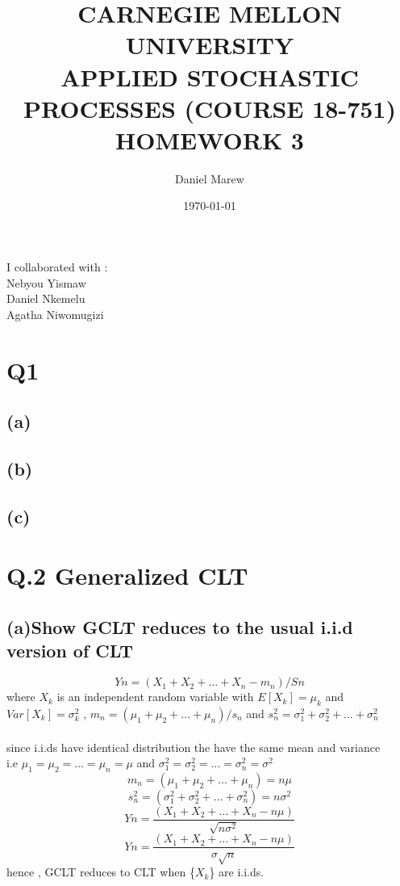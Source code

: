 \documentclass[a4paper,11pt]{article}
\begin{document}
\title{\color{red}CARNEGIE MELLON UNIVERSITY\\
APPLIED STOCHASTIC PROCESSES  (COURSE 18-751)\\
HOMEWORK 3}
\author{Daniel Marew}
\date{\today}
\clearpage\maketitle

\thispagestyle{empty}
\newpage
I collaborated with :\\
\hspace*{6cm}
Nebyou Yismaw\\
\hspace*{6cm}
Daniel    Nkemelu\\
\hspace*{6cm}
Agatha Niwomugizi
\thispagestyle{empty}
\newpage
\clearpage
\setcounter{page}{1}

\section*{Q1}
\subsection*{(a)}
\subsection*{(b)}
\subsection*{(c)}

\newpage
\section*{Q.2 Generalized CLT}
\subsection*{(a)\quad Show GCLT reduces to the usual i.i.d version of CLT}
$$Yn = (X_1+X_2+ \dots +X_n-m_n)/Sn$$
where $X_k$ is an independent random variable with $E[X_k]=\mu_k$ and $Var[X_k]= \sigma_k^2$ ,
$m_n = (\mu_1+\mu_2+\dots +\mu_n)/s_n$ and $s_n^2=\sigma_1^2+\sigma_2^2+\dots+\sigma_n^2$\\\\
since i.i.ds have identical distribution the have the same mean and variance\\
i.e $\mu_1=\mu_2=\dots =\mu_n=\mu$ and $\sigma_1^2=\sigma_2^2=\dots=\sigma_n^2=\sigma^2$ \\
$$m_n = (\mu_1+\mu_2+\dots +\mu_n)=n\mu$$
$$s_n^2=(\sigma_1^2+\sigma_2^2+\dots+\sigma_n^2)=n\sigma^2$$
$$Yn = \frac{(X_1+X_2+ \dots +X_n-n\mu)}{\sqrt{n\sigma^2}}$$
$$Yn = \frac{(X_1+X_2+ \dots +X_n-n\mu)}{\sigma\sqrt{n}}$$
hence , GCLT reduces to CLT when \{$X_k$\} are i.i.ds.
\end{document}

